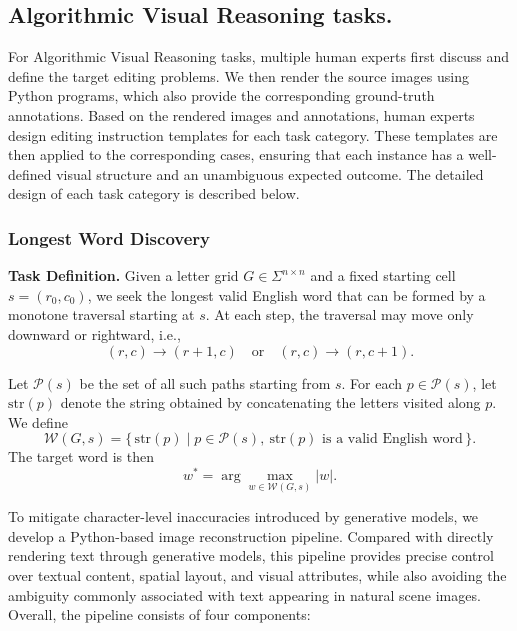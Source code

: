 \documentclass{llmxive}
\begin{document}
\subsection{Algorithmic Visual Reasoning tasks.}
\label{Algorithm Visual Reasoning tasks}
For Algorithmic Visual Reasoning tasks, multiple human experts first discuss and define the target editing problems. We then render the source images using Python programs, which also provide the corresponding ground-truth annotations. Based on the rendered images and annotations, human experts design editing instruction templates for each task category. These templates are then applied to the corresponding cases, ensuring that each instance has a well-defined visual structure and an unambiguous expected outcome.  The detailed design of each task category is described below.

\subsubsection{Longest Word Discovery}
\label{supp:Longest Word Discovery}

\textbf{Task Definition.} Given a letter grid \( G \in \Sigma^{n \times n} \) and a fixed starting cell
\( s = (r_0, c_0) \), we seek the longest valid English word that can be formed
by a monotone traversal starting at \( s \). At each step, the traversal may
move only downward or rightward, i.e.,
\[
(r,c) \rightarrow (r+1,c)
\quad \text{or} \quad
(r,c) \rightarrow (r,c+1).
\]

Let \( \mathcal{P}(s) \) be the set of all such paths starting from \( s \).
For each \( p \in \mathcal{P}(s) \), let \( \mathrm{str}(p) \) denote the string
obtained by concatenating the letters visited along \( p \). We define
\[
\mathcal{W}(G,s) = \{\, \mathrm{str}(p) \mid p \in \mathcal{P}(s),\ \mathrm{str}(p)
\text{ is a valid English word} \,\}.
\]
The target word is then
\begin{equation}
w^* = \arg\max_{w \in \mathcal{W}(G,s)} |w|.
\end{equation}

To mitigate character-level inaccuracies introduced by generative models, we
develop a Python-based image reconstruction pipeline. Compared with directly
rendering text through generative models, this pipeline provides precise
control over textual content, spatial layout, and visual attributes, while
also avoiding the ambiguity commonly associated with text appearing in natural
scene images. Overall, the pipeline consists of four components:
\end{document}
